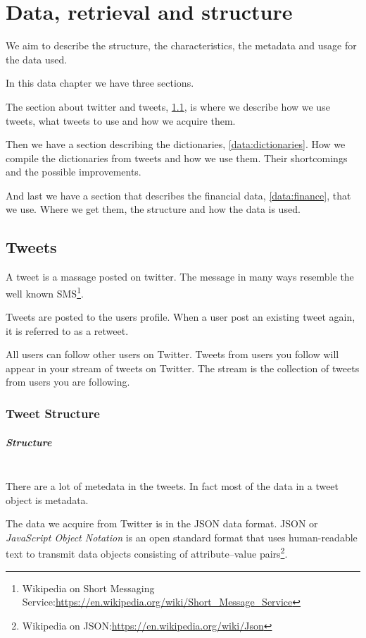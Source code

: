 \chapter{Data, retrieval and structure}\label{data}
We aim to describe the structure, the characteristics, the metadata and usage
for the data used. 

In this data chapter we have three sections. 

The section about twitter and tweets, \ref{data:tweets}, is where we describe
how we use tweets, what tweets to use and how we acquire them.

Then we have a section describing the dictionaries, \ref{data:dictionaries}. How
we compile the dictionaries from tweets and how we use them. Their shortcomings
and the possible improvements.  

And last we have a section that describes the financial data,
\ref{data:finance}, that we use. Where we get them, the structure and how the
data is used. 
%

\section{Tweets}\label{data:tweets}
A tweet is a massage posted on twitter. The message in many ways resemble the
well known SMS\footnote{Wikipedia on Short Messaging
Service:\url{https://en.wikipedia.org/wiki/Short_Message_Service}}.

Tweets are posted to the users profile. When a user post an existing tweet
again, it is referred to as a retweet. 

All users can follow other users on Twitter. Tweets from users you follow will
appear in your stream of tweets on Twitter. The stream is the collection of
tweets from users you are following.  
%

\subsection{Tweet Structure}
\paragraph{Structure}
\hspace{0pt}\\
There are a lot of metedata in the tweets. In fact most of the data in a tweet
object is metadata. 

The data we acquire from Twitter is in the JSON data format. JSON or \textit{JavaScript
Object Notation} is an open standard format that uses human-readable text to
transmit data objects consisting of attribute–value
pairs\footnote{Wikipedia on JSON:\url{https://en.wikipedia.org/wiki/Json}}.

